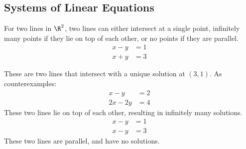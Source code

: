 \documentclass{math}
\begin{document}
\subsection*{Systems of Linear Equations}
For two lines in \( \R^2 \), two lines can either intersect at a single point,
infinitely many points if they lie on top of each other, or no points if they
are parallel.
\begin{align*}
  x-y &= 1 \\
  x+y &= 3
\end{align*}
\begin{center}
\end{center}
These are two lines that intersect with a unique solution at \( (3,1) \). As
counterexamples:
\begin{align*}
  x-y &= 2 \\
  2x-2y &= 4
\end{align*}
These two lines lie on top of each other, resulting in infinitely many
solutions.
\begin{align*}
  x-y &= 1 \\
  x-y &= 3
\end{align*}
These two lines are parallel, and have no solutions.
\end{document}
